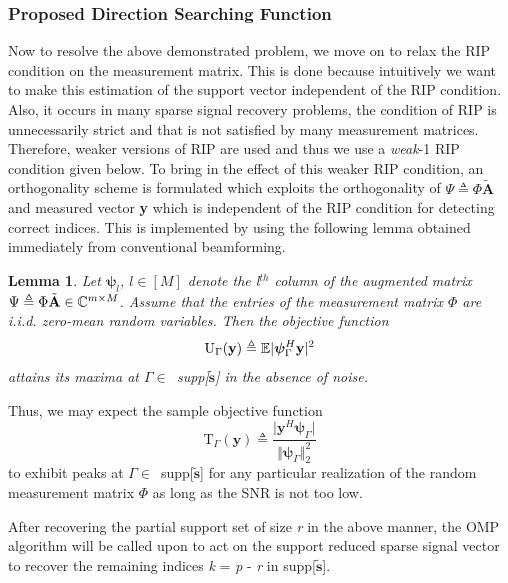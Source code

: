 \documentclass[12pt,a4paper]{article}
\theoremstyle{plain}
\newtheorem{lem}[thm]{Lemma}
\theoremstyle{definition}
\begin{document}
\subsubsection{Proposed Direction Searching Function}
Now to resolve the above demonstrated problem, we move on to relax the RIP condition on the measurement matrix. This is done because intuitively we want to make this estimation of the support vector independent of the RIP condition. Also, it occurs in many sparse signal recovery problems, the condition of RIP is unnecessarily strict and that is not satisfied by many measurement matrices. Therefore, weaker versions of RIP are used and thus we use a \textit{weak}-1 RIP condition given below.
To bring in the effect of this weaker RIP condition, an orthogonality scheme is formulated which exploits the orthogonality of $\Psi\triangleq\Phi\tilde{\textbf{A}}$ and measured vector \textbf{y} which is independent of the RIP condition for detecting correct indices. This is implemented by using the following lemma obtained immediately from conventional beamforming.
\begin{lem} 
Let $\bm{\psi}_l$, $l\in [M]$ denote the \textit{l}$^{th}$ column of the augmented matrix $\Psi \triangleq \Phi\textup{$\tilde{\textbf{A}}$} \in \mathbb{C}^{m\times M}$. Assume that the entries of the measurement matrix $\Phi$ are i.i.d. zero-mean random variables. Then the objective function
\begin{equation}\label{eq:b1}
\textup{\textrm{U}}_\Gamma(\textbf{y}) \triangleq \mathbb{E}\vert\bm{\psi}^H_\Gamma\textup{\textbf{y}}\vert^2
\end{equation}
attains its maxima at $\Gamma\in$~\textup{supp[$\tilde{\textbf{s}}$]} in the absence of noise.
\end{lem}
Thus, we may expect the sample objective function 
\begin{equation}\label{eq:7i}
\textrm{T}_{\Gamma}(\textbf{y}) \triangleq \frac{\vert\textbf{y}^H\bm{\psi}_\Gamma\vert}{\Vert\bm{\psi}_\Gamma\Vert_2^2}
\end{equation}
to exhibit peaks at $\Gamma\in$~supp[$\tilde{\textbf{s}}$] for any particular realization of the random measurement matrix $\Phi$ as long as the SNR is not too low.

After recovering the partial support set of size \textit{r} in the above manner, the OMP algorithm will be called upon to act on the support reduced sparse signal vector to recover the remaining indices \textit{k} = \textit{p} - \textit{r} in supp[$\tilde{\textbf{s}}$].
\end{document}
